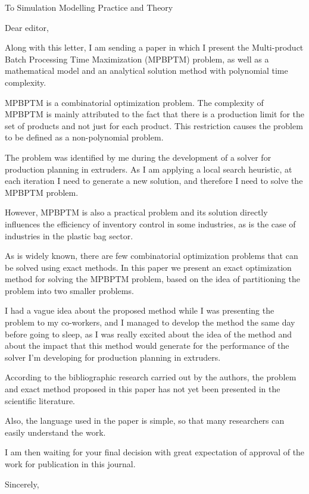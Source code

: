 \documentclass[
  fontsize=11pt,
  paper=a4,
  parskip=half,
  enlargefirstpage=on,    %
  fromalign=right,        %
  fromphone=off,          %
  fromrule=aftername,     %
  addrfield=on,           %
  backaddress=on,         %
  subject=beforeopening,  %
  locfield=narrow,        %
  foldmarks=on,           %
]{scrlttr2}
\begin{document}
\begin{letter}{To Simulation Modelling Practice and Theory}
    \opening{Dear editor,}

	Along with this letter, I am sending a paper in which I present the Multi-product Batch Processing Time Maximization (MPBPTM) problem, as well as a mathematical model and an analytical solution method with polynomial time complexity.
	
MPBPTM is a combinatorial optimization problem. The complexity of MPBPTM is mainly attributed to the fact that there is a production limit for the set of products and not just for each product. This restriction causes the problem to be defined as a non-polynomial problem.

The problem was identified by me during the development of a solver for production planning in extruders. As I am applying a local search heuristic, at each iteration I need to generate a new solution, and therefore I need to solve the MPBPTM problem.

However, MPBPTM is also a practical problem and its solution directly influences the efficiency of inventory control in some industries, as is the case of industries in the plastic bag sector.

As is widely known, there are few combinatorial optimization problems that can be solved using exact methods. In this paper we present an exact optimization method for solving the MPBPTM problem, based on the idea of partitioning the problem into two smaller problems.

I had a vague idea about the proposed method while I was presenting the problem to my co-workers, and I managed to develop the method the same day before going to sleep, as I was really excited about the idea of the method and about the impact that this method would generate for the performance of the solver I'm developing for production planning in extruders.

According to the bibliographic research carried out by the authors, the problem and exact method proposed in this paper has not yet been presented in the scientific literature.

Also, the language used in the paper is simple, so that many researchers can easily understand the work.

I am then waiting for your final decision with great expectation of approval of the work for publication in this journal.	
    \closing{Sincerely,}
  \end{letter}
\end{document}
